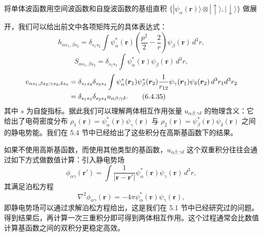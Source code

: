 将单体波函数用空间波函数和自旋波函数的基组直积 $\{|\psi_\alpha(\bm r)\rangle\otimes|\uparrow\rangle,|\downarrow\rangle\}$ 做展

开，我们可以给出前文中各项矩阵元的具体表达式：
\begin{equation}
 h_{\alpha s_1,\beta s_2}=\delta_{s_1s_2}\int\psi_\alpha^*(\bm r)\left(\frac{p^2}{2}-\frac2r\right)\psi_\beta(\bm r)\,d^3r,
\tag{6.4.33}
\end{equation}
\begin{equation}
 S_{\alpha s_1,\beta s_2}=\delta_{s_1s_2}\int\psi_\alpha^*(\bm r)\psi_\beta(\bm r)\,d^3r,
\tag{6.4.34}
\end{equation}
\begin{align}
 v_{\alpha s_1,\beta s_2;\gamma s_3,\delta s_4}
 &=\delta_{s_1s_3}\delta_{s_2s_4}
 \int\psi_\alpha^*(\bm r_1)\psi_\beta^*(\bm r_2)\frac1{r_{12}}
 \psi_\gamma(\bm r_1)\psi_\delta(\bm r_2)\,d^3r_1d^3r_2\notag\\
 &=\delta_{s_1s_3}\delta_{s_2s_4}u_{\alpha\beta;\gamma\delta}.
\tag{6.4.35}
\end{align}
其中 $s$ 为自旋指标。据此我们可以理解两体相互作用张量 $u_{\alpha\beta;\gamma\delta}$ 的物理含义：它给出了电荷密度分布 $\rho_1(\bm r)=\psi_\alpha^*(\bm r)\psi_\gamma(\bm r)$ 与 $\rho_2(\bm r)=\psi_\beta^*(\bm r)\psi_\delta(\bm r)$ 之间的静电势能。我们在 5.4 节中已经给出了这些积分在高斯基函数下的结果。

如果不使用高斯基函数，而使用其他类型的基函数，$u_{\alpha\beta;\gamma\delta}$ 这个双重积分往往会通过如下方式做数值计算：引入静电势场
\begin{equation}
 \phi_{\alpha\gamma}(\bm r')=\int\frac{1}{|\bm r-\bm r'|}\psi_\alpha^*(\bm r)\psi_\gamma(\bm r)\,d^3r,
\tag{6.4.36}
\end{equation}
其满足泊松方程
\begin{equation}
 \nabla^2\phi_{\alpha\gamma}(\bm r)=-4\pi\psi_\alpha^*(\bm r)\psi_\gamma(\bm r),
\tag{6.4.37}
\end{equation}
即静电势场可以通过求解泊松方程给出，这是我们在 5.1 节中已经研究过的问题。得到结果后，再计算一次三重积分即可得到两体相互作用。这个过程通常会比数值计算基函数之间的双积分更稳定高效。

